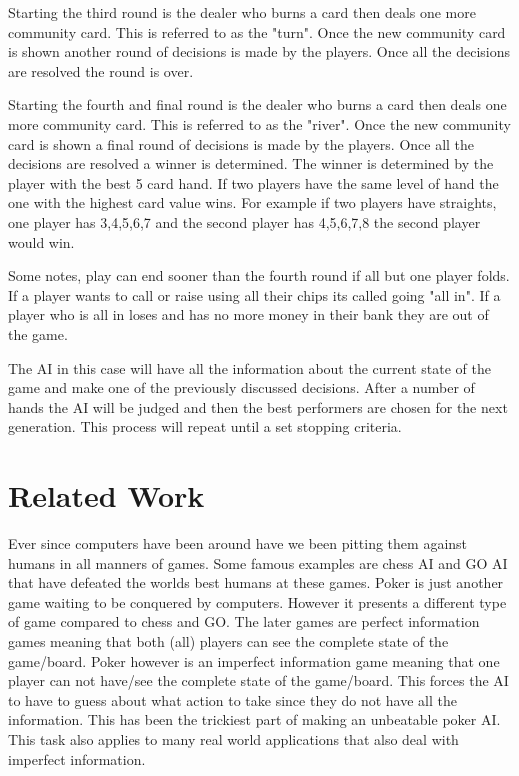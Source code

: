 Starting the third round is the dealer who burns a card then deals one more community card. This is referred to as the "turn". Once the new community card is shown another round of decisions is made by the players. Once all the decisions are resolved the round is over.

Starting the fourth and final round is the dealer who burns a card then deals one more community card. This is referred to as the "river". Once the new community card is shown a final round of decisions is made by the players. Once all the decisions are resolved a winner is determined. The winner is determined by the player with the best 5 card hand. If two players have the same level of hand the one with the highest card value wins. For example if two players have straights, one player has 3,4,5,6,7 and the second player has 4,5,6,7,8 the second player would win.

Some notes, play can end sooner than the fourth round if all but one player folds. If a player wants to call or raise using all their chips its called going "all in". If a player who is all in loses and has no more money in their bank they are out of the game.

The AI in this case will have all the information about the current state of the game and make one of the previously discussed decisions. After a number of hands the AI will be judged and then the best performers are chosen for the next generation. This process will repeat until a set stopping criteria.


\section{Related Work}
Ever since computers have been around have we been pitting them against humans in all manners of games. Some famous examples are chess AI and GO AI that have defeated the worlds best humans at these games\cite{brown2017libratus}\cite{gilpin2005optimal}\cite{doi:10.1126/science.aay2400}. Poker is just another game waiting to be conquered by computers. However it presents a different type of game compared to chess and GO. The later games are perfect information games meaning that both (all) players can see the complete state of the game/board. Poker however is an imperfect information game meaning that one player can not have/see the complete state of the game/board\cite{brown2017libratus}\cite{davidson2000improved}\cite{gilpin2005optimal}\cite{gilpin2006competitive}\cite{doi:10.1126/science.aay2400}. This forces the AI to have to guess about what action to take since they do not have all the information. This has been the trickiest part of making an unbeatable poker AI. This task also applies to many real world applications that also deal with imperfect information.

